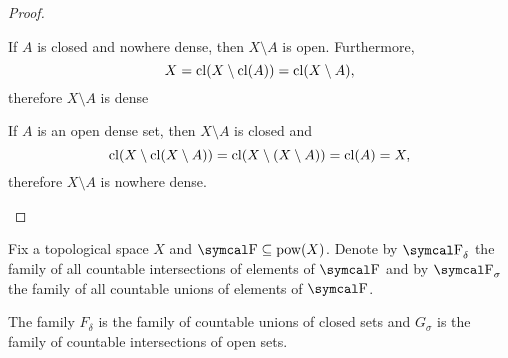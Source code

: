 \begin{proof}
\begin{description}
    \mbox{}
    \begin{description}
      \Implies If \( A \) is closed and nowhere dense, then \( X \setminus A \) is open. Furthermore,
      \begin{equation*}
        X
        =
        \operatorname{cl}(X \setminus \operatorname{cl}(A))
        =
        \operatorname{cl}(X \setminus A),
      \end{equation*}
      therefore \( X \setminus A \) is dense

      \ImpliedBy If \( A \) is an open dense set, then \( X \setminus A \) is closed and
      \begin{equation*}
        \operatorname{cl}(X \setminus \operatorname{cl}(X \setminus A))
        =
        \operatorname{cl}(X \setminus (X \setminus A))
        =
        \operatorname{cl}(A)
        =
        X,
      \end{equation*}
      therefore \( X \setminus A \) is nowhere dense.
    \end{description}
  \end{description}
\end{proof}

\begin{definition}\label{def:borel_algebra}
  Fix a topological space \( X \) and \( \CF \subseteq \Pow(X) \). Denote by \( \CF_\delta \) the family of all countable intersections of elements of \( \CF \) and by \( \CF_\sigma \) the family of all countable unions of elements of \( \CF \).

  The family \( F_\delta \) is the family of countable unions of closed sets and \( G_\sigma \) is the family of countable intersections of open sets.
\end{definition}

